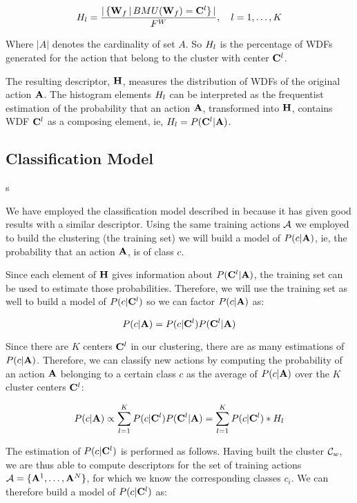 \documentclass{fcs}
\begin{document}
\begin{equation}
\label{histogram}
H_l = \frac{ | \, \{ \mathbf{W}_f \, | \, BMU(\mathbf{W}_f) = \mathbf{C}^{l}  \} \, | }{ F^W }, \quad l=1,\dots,K
\end{equation}

Where $|A|$ denotes the cardinality of set $A$. So $H_l$ is the percentage of WDFs generated for the action that belong to the cluster with center $\mathbf{C}^{l}$.

The resulting descriptor, $\mathbf{H}$, measures the distribution of WDFs of the original action $\mathbf{A}$. The histogram elements $H_l$ can be interpreted as the frequentist estimation of the probability that an action $\mathbf{A}$, transformed into $\mathbf{H}$, contains WDF $\mathbf{C}^{l}$ as a composing element, ie, $H_l = P( \mathbf{C}^{l}  | \mathbf{A} )$.

\subsection{Classification Model}
s

We have employed the classification model described in \cite{Estrebou2010} because it has given good results with a similar descriptor. Using the same training actions $\mathcal{A}$ we employed to build the clustering (the training set) we will build a model of $P(c | \mathbf{A})$, ie, the probability that an action $\mathbf{A}$, is of class $c$. 

Since each element of $\mathbf{H}$ gives information about $P( \mathbf{C}^{l}  | \mathbf{A} )$, the training set can be used to estimate those probabilities. Therefore, we will use the training set as well to build a model of $P(c | \mathbf{C}^{l})$ so we can factor $P(c | \mathbf{A})$ as:

\begin{equation}
\label{factorization}
P(c | \mathbf{A}) = P(c | \mathbf{C}^{l}) P( \mathbf{C}^{l} | \mathbf{A})
\end{equation}

Since there are $K$ centers $\mathbf{C}^{l}$ in our clustering, there are as many estimations of $P(c | \mathbf{A})$. Therefore, we can classify new actions by computing the probability of an action $\mathbf{A}$ belonging to a certain class $c$ as the average of $P(c | \mathbf{A})$ over the $K$ cluster centers $\mathbf{C}^{l}$:

\begin{equation}
\label{classactionmodel}
P(c | \mathbf{A}) \propto \sum_{l=1}^{K} P(c | \mathbf{C}^{l}) P( \mathbf{C}^{l} | \mathbf{A}) = \sum_{l=1}^{K} P(c | \mathbf{C}^{l}) * H_l
\end{equation}


The estimation of $P(c | \mathbf{C}^{l})$ is performed as follows. Having built the cluster $\mathcal{C}_w$, we are thus able to compute descriptors for the set of training actions $\mathcal{A}=\{ \mathbf{A}^1,\dots,\mathbf{A}^N \}$, for which we know the corresponding classes $c_i$. We can therefore build a model of $P(c | \mathbf{C}^{l})$ as:
\end{document}
